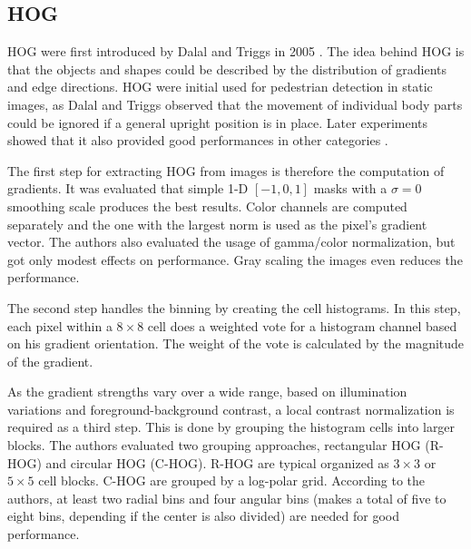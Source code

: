 \subsection{\acf{HOG}}
\label{sec:hog}

\ac{HOG} were first introduced by Dalal and Triggs in 2005 \cite{Dalal2005}. The idea behind \ac{HOG} is that the objects and shapes could be described by the distribution of gradients and edge directions. \ac{HOG} were initial used for pedestrian detection in static images, as Dalal and Triggs observed that the movement of individual body parts could be ignored if a general upright position is in place. Later experiments showed that it also provided good performances in other categories \cite{Malisiewicz2011}.

The first step for extracting \ac{HOG} from images is therefore the computation of gradients. It was evaluated that simple 1-D $[-1, 0, 1]$ masks with a $\sigma = 0$ smoothing scale produces the best results. Color channels are computed separately and the one with the largest norm is used as the pixel's gradient vector. The authors also evaluated the usage of gamma/color normalization, but got only modest effects on performance. Gray scaling the images even reduces the performance.

The second step handles the binning by creating the cell histograms. In this step, each pixel within a $8 \times 8$ cell does a weighted vote for a histogram channel based on his gradient orientation. The weight of the vote is calculated by the magnitude of the gradient.

As the gradient strengths vary over a wide range, based on illumination variations and foreground-background contrast, a local contrast normalization is required as a third step. This is done by grouping the histogram cells into larger blocks. The authors evaluated two grouping approaches, rectangular HOG (\acs{R-HOG}) and circular HOG (\acs{C-HOG}). \acs{R-HOG} are typical organized as $3\times3$ or $5\times5$ cell blocks. \acs{C-HOG} are grouped by a log-polar grid. According to the authors, at least two radial bins and four angular bins (makes a total of five to eight bins, depending if the center is also divided) are needed for good performance.

